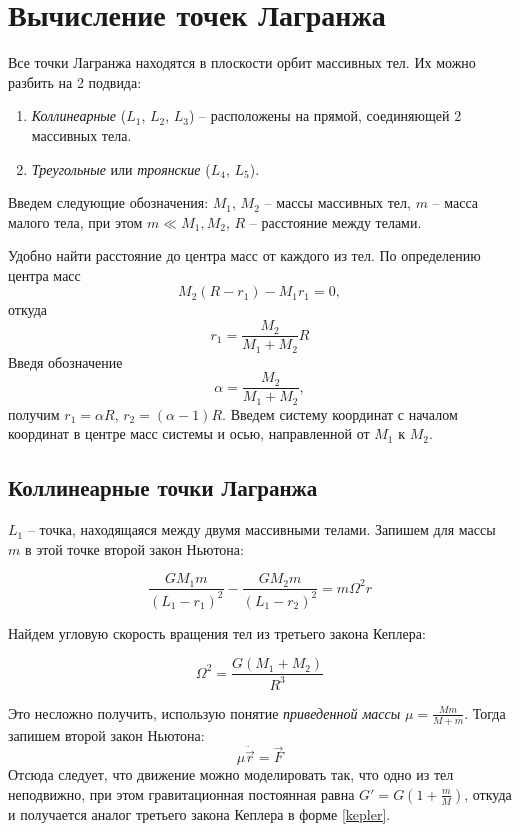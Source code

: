 \documentclass[12pt]{article}
\begin{document}
    \section{Вычисление точек Лагранжа}
    Все точки Лагранжа находятся в плоскости орбит массивных тел. Их можно
    разбить на 2 подвида:
    \begin{enumerate}
        \item \textit{Коллинеарные} ($L_1$, $L_2$, $L_3$) -- расположены на прямой,
        соединяющей 2 массивных тела.
        \item \textit{Треугольные} или \textit{троянские} ($L_4$, $L_5$).
    \end{enumerate}
    \par Введем следующие обозначения: $M_1$, $M_2$ -- массы массивных тел,
    $m$ -- масса малого тела, при этом $m \ll M_1, M_2$, $R$ -- расстояние
    между телами.
    \par Удобно найти расстояние до центра масс от каждого из тел. По
    определению центра масс
    $$ M_2(R - r_1) - M_1r_1 = 0, $$
    откуда
    $$ r_1 = \frac{M_2}{M_1 + M_2}R $$
    Введя обозначение
    $$ \alpha = \frac{M_2}{M_1 + M_2}, $$
    получим $r_1 = \alpha R$, $r_2 = (\alpha - 1)R$.
    Введем систему координат с началом координат в центре масс системы
    и осью, направленной от $M_1$ к $M_2$.

    \subsection{Коллинеарные точки Лагранжа}
    \par $L_1$ -- точка, находящаяся между двумя массивными телами. Запишем для
    массы $m$ в этой точке второй закон Ньютона:

    \begin{equation}
        \frac{GM_1m}{(L_1 - r_1)^2} - \frac{GM_2m}{(L_1 - r_2)^2} = m\Omega^2r
        \label{L1}
    \end{equation}

    \par Найдем угловую скорость вращения тел из третьего закона Кеплера:

    \begin{equation}
        \Omega^2 = \frac{G(M_1 + M_2)}{R^3}
        \label{kepler}
    \end{equation}

    Это несложно получить, использую понятие \textit{приведенной массы}
    $\mu = \frac{Mm}{M + m} $. Тогда запишем второй закон Ньютона:
    $$ \mu \ddot{\vec{r}} = \vec{F} $$
    Отсюда следует, что движение можно моделировать так, что одно из тел
    неподвижно, при этом гравитационная постоянная равна $ G' = 
    G\left(1 + \frac{m}{M}\right) $, откуда и получается аналог третьего закона
    Кеплера в форме \ref{kepler}.
\end{document}
